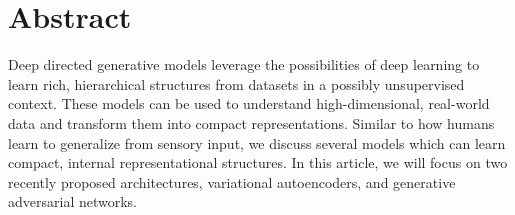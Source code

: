 \section{Abstract}
\label{sec:abstract}

Deep directed generative models leverage the possibilities of deep learning to learn rich, hierarchical structures from datasets in a possibly unsupervised context.
These models can be used to understand high-dimensional, real-world data and transform them into compact representations. Similar to how humans learn to generalize from sensory input, we discuss several models which can learn compact, internal representational structures.
In this article, we will focus on two recently proposed architectures, variational autoencoders, and generative adversarial networks.







